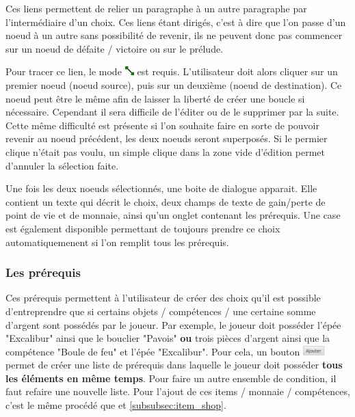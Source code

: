 			Ces liens permettent de relier un paragraphe à un autre paragraphe par l'intermédiaire d'un choix. Ces liens étant dirigés, c'est à dire que l'on passe d'un noeud à un autre sans possibilité de revenir, ils ne peuvent donc pas commencer sur un noeud de défaite / victoire ou sur le prélude.

			Pour tracer ce lien, le mode \includegraphics[height=10pt, keepaspectratio]{img/icons/add_link.png} est requis. L'utilisateur doit alors cliquer sur un premier noeud (noeud source), puis sur un deuxième (noeud de destination). Ce noeud peut être le même afin de laisser la liberté de créer une boucle si nécessaire. Cependant il sera difficile de l'éditer ou de le supprimer par la suite. Cette même difficulté est présente si l'on souhaite faire en sorte de pouvoir revenir au noeud précédent, les deux noeuds seront superposés. Si le permier clique n'était pas voulu, un simple clique dans la zone vide d'édition permet d'annuler la sélection faite.

			Une fois les deux noeuds sélectionnés, une boite de dialogue apparait. Elle contient un texte qui décrit le choix, deux champs de texte de gain/perte de point de vie et de monnaie, ainsi qu'un onglet contenant les prérequis. Une case est également disponible permettant de toujours prendre ce choix automatiquemenent si l'on remplit tous les prérequis.

			\subsubsection{Les prérequis}
				\label{sec:prerequis}

				Ces prérequis permettent à l'utilisateur de créer des choix qu'il est possible d'entreprendre que si certains objets / compétences / une certaine somme d'argent sont possédés par le joueur. Par exemple, le joueur doit posséder l'épée "Excalibur" ainsi que le bouclier "Pavois" \textbf{ou} trois pièces d'argent ainsi que la compétence "Boule de feu" et l'épée "Excalibur". Pour cela, un bouton \includegraphics[height=10pt, keepaspectratio]{img/ajouterBouton.png} permet de créer une liste de prérequis dans laquelle le joueur doit posséder \textbf{tous les éléments en même temps}. Pour faire un autre ensemble de condition, il faut refaire une nouvelle liste.
				Pour l'ajout de ces items / monnaie / compétences, c'est le même procédé que  et \ref{subsubsec:item_shop}.

